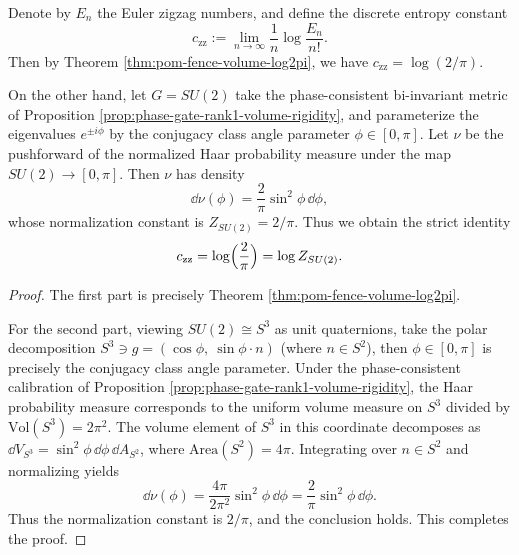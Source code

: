 \begin{corollary}\label{cor:zigzag-entropy-su2-weyl-constant}
Denote by \(E_n\) the Euler zigzag numbers, and define the discrete entropy constant
\[
c_{\mathrm{zz}}:=\lim_{n\to\infty}\frac1n\log\frac{E_n}{n!}.
\]
Then by Theorem \ref{thm:pom-fence-volume-log2pi}, we have \(c_{\mathrm{zz}}=\log(2/\pi)\).
\par
On the other hand, let \(G=SU(2)\) take the phase-consistent bi-invariant metric of Proposition \ref{prop:phase-gate-rank1-volume-rigidity}, and parameterize the eigenvalues \(e^{\pm i\phi}\) by the conjugacy class angle parameter \(\phi\in[0,\pi]\).
Let \(\nu\) be the pushforward of the normalized Haar probability measure under the map \(SU(2)\to[0,\pi]\).
Then \(\nu\) has density
\[
\dd\nu(\phi)=\frac{2}{\pi}\sin^{2}\phi\,\dd\phi,
\]
whose normalization constant is \(Z_{SU(2)}=2/\pi\).
Thus we obtain the strict identity
\[
c_{\mathrm{zz}}=\log\Bigl(\frac{2}{\pi}\Bigr)=\log Z_{SU(2)}.
\]
\end{corollary}
\begin{proof}
The first part is precisely Theorem \ref{thm:pom-fence-volume-log2pi}.
\par
For the second part, viewing \(SU(2)\cong S^{3}\) as unit quaternions, take the polar decomposition
\(
S^{3}\ni g=(\cos\phi,\ \sin\phi\cdot n)
\)
(where \(n\in S^{2}\)), then \(\phi\in[0,\pi]\) is precisely the conjugacy class angle parameter.
Under the phase-consistent calibration of Proposition \ref{prop:phase-gate-rank1-volume-rigidity}, the Haar probability measure corresponds to the uniform volume measure on \(S^{3}\) divided by \(\mathrm{Vol}(S^{3})=2\pi^{2}\).
The volume element of \(S^{3}\) in this coordinate decomposes as
\(
\dd V_{S^{3}}=\sin^{2}\phi\,\dd\phi\,\dd A_{S^{2}}
\), where \(\mathrm{Area}(S^{2})=4\pi\).
Integrating over \(n\in S^{2}\) and normalizing yields
\[
\dd\nu(\phi)=\frac{4\pi}{2\pi^{2}}\sin^{2}\phi\,\dd\phi=\frac{2}{\pi}\sin^{2}\phi\,\dd\phi.
\]
Thus the normalization constant is \(2/\pi\), and the conclusion holds. This completes the proof.
\end{proof}

